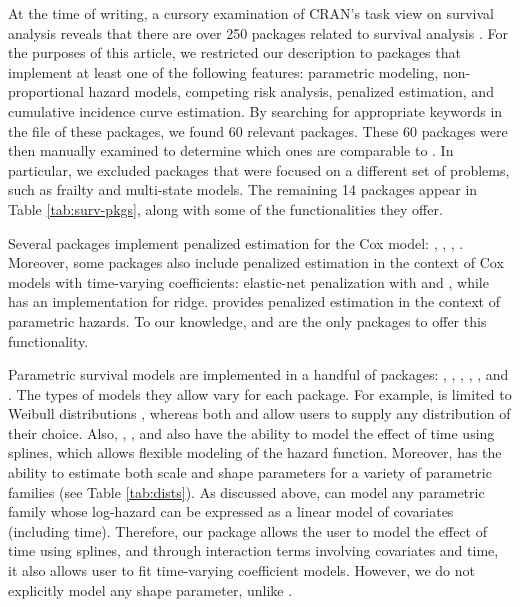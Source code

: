\documentclass[
]{jss}
\begin{document}
At the time of writing, a cursory examination of CRAN's task view on
survival analysis reveals that there are over 250 packages related to
survival analysis \citeyearpar{survTaskView}. For the purposes of this
article, we restricted our description to packages that implement at
least one of the following features: parametric modeling,
non-proportional hazard models, competing risk analysis, penalized
estimation, and cumulative incidence curve estimation. By searching for
appropriate keywords in the  file of these packages,
we found 60 relevant packages. These 60 packages were then manually
examined to determine which ones are comparable to . In
particular, we excluded packages that were focused on a different set of
problems, such as frailty and multi-state models. The remaining 14
packages appear in Table \ref{tab:surv-pkgs}, along with some of the
functionalities they offer.

Several packages implement penalized estimation for the Cox model:
 \citeyearpar{regpathcox}, 
\citeyearpar{park_hastie},  \citeyearpar{l1penal},
 \citeyearpar{gerds_blanche}. Moreover, some
packages also include penalized estimation in the context of Cox models
with time-varying coefficients: elastic-net penalization with
 \citeyearpar{perperoglou} and 
\citeyearpar{clements_liu}, while 
\citeyearpar{survival-package} has an implementation for ridge.
 provides penalized estimation in the context of
parametric hazards. To our knowledge,  and 
are the only packages to offer this functionality.

Parametric survival models are implemented in a handful of packages:
 \citeyearpar{mahani2015bayesian}, 
\citeyearpar{flexsurv},  \citeyearpar{smoothHazard},
 \citeyearpar{clements_liu}, 
\citeyearpar{scheike2014estimating}, and . The types of
models they allow vary for each package. For example, 
is limited to Weibull distributions \citeyearpar{smoothHazard}, whereas
both  and  allow users to supply any
distribution of their choice. Also, , ,
 and  also have the ability to model the effect of
time using splines, which allows flexible modeling of the hazard
function. Moreover,  has the ability to estimate both
scale and shape parameters for a variety of parametric families (see
Table \ref{tab:dists}). As discussed above,  can model any
parametric family whose log-hazard can be expressed as a linear model of
covariates (including time). Therefore, our package allows the user to
model the effect of time using splines, and through interaction terms
involving covariates and time, it also allows user to fit time-varying
coefficient models. However, we do not explicitly model any shape
parameter, unlike .
\end{document}

